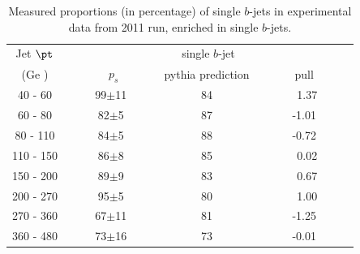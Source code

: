 \begin{table}[!hbt] %
\renewcommand{\arraystretch}{1.2}
\centering
\begin{tabular}{ | c || c | c | c ||}
  \hline
  Jet $\pt$ & \multicolumn{3}{c||}{single $b$-jet}\\ \cline{2-4}
    (Ge ) & ~~~~~~~$p_s$~~~~~~ & pythia prediction & ~~~~~~pull~~~~~~\\ \hline
   40 - 60 &  99$\pm$11 & 84   & ~1.37 \\  
   60 - 80 &  82$\pm$5  &  87  & -1.01\\ 
   80 - 110&  84$\pm$5  &  88 &  -0.72\\ 
  110 - 150&  86$\pm$8  &  85 &  ~0.02\\ 
  150 - 200&  89$\pm$9  &  83 &  ~0.67 \\ 
  200 - 270&  95$\pm$5  &  80 &  ~1.00 \\ 
  270 - 360&  67$\pm$11  &  81 & -1.25 \\ 
  360 - 480&  73$\pm$16  &  73 & -0.01 \\ \hline
\end{tabular}
\caption{Measured proportions (in percentage) of single $b$-jets in experimental data from 2011 run, enriched in single $b$-jets.}
\label{tb:fitfractions2btagS}
\end{table}


